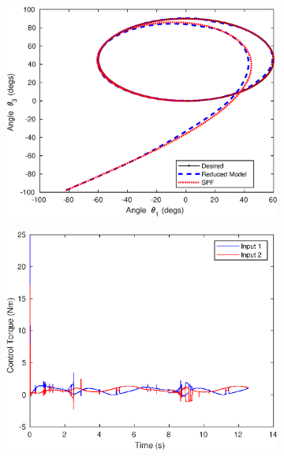 \documentclass[10pt,final,journal,letterpaper,oneside,twocolumn]{IEEEtran}
\newcounter{mytempcntr}
\begin{document}
\begin{figure}[!h]
  \centering
  \centering
  \begin{subfigure}[!t]{0.5\linewidth}
    \centering
    \includegraphics[width=0.7\linewidth]{./FIGS/TRACKOBJ}
    \caption{}
    \label{fig:trackobj}
  \end{subfigure}%
  \begin{subfigure}[!t]{0.5\linewidth}
    \centering
    \includegraphics[width=0.7\linewidth]{./FIGS/TRACK_3}
    \caption{}
    \label{fig:track3}
  \end{subfigure}
  

\end{figure}
\end{document}
